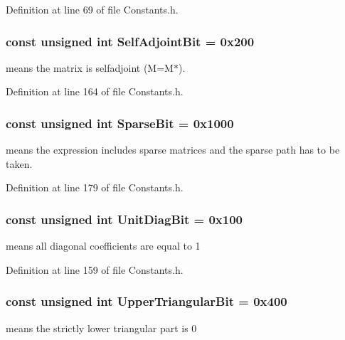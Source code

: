 Definition at line 69 of file Constants.\-h.

\hypertarget{group__flags_gadb6040aad0695de4085f5dc5e641c66f}{
\subsubsection[{Self\-Adjoint\-Bit}]{\setlength{\rightskip}{0pt plus 5cm}const unsigned {\bf int} Self\-Adjoint\-Bit = 0x200}}\label{group__flags_gadb6040aad0695de4085f5dc5e641c66f}
means the matrix is selfadjoint (M=M$\ast$). 

Definition at line 164 of file Constants.\-h.

\hypertarget{group__flags_ga3c602d309bf5c3f5eba3d972bde5490c}{
\subsubsection[{Sparse\-Bit}]{\setlength{\rightskip}{0pt plus 5cm}const unsigned {\bf int} Sparse\-Bit = 0x1000}}\label{group__flags_ga3c602d309bf5c3f5eba3d972bde5490c}
means the expression includes sparse matrices and the sparse path has to be taken. 

Definition at line 179 of file Constants.\-h.

\hypertarget{group__flags_ga254555b50eae5fa8a8d241f6bc08939a}{
\subsubsection[{Unit\-Diag\-Bit}]{\setlength{\rightskip}{0pt plus 5cm}const unsigned {\bf int} Unit\-Diag\-Bit = 0x100}}\label{group__flags_ga254555b50eae5fa8a8d241f6bc08939a}
means all diagonal coefficients are equal to 1 

Definition at line 159 of file Constants.\-h.

\hypertarget{group__flags_ga2c91e62bfb42e3ac7a6aae2153d2e8dc}{
\subsubsection[{Upper\-Triangular\-Bit}]{\setlength{\rightskip}{0pt plus 5cm}const unsigned {\bf int} Upper\-Triangular\-Bit = 0x400}}\label{group__flags_ga2c91e62bfb42e3ac7a6aae2153d2e8dc}
means the strictly lower triangular part is 0 

